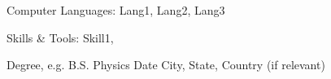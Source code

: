 \documentclass{article}
\begin{document}

\begin{skills}
    \item[Computer Languages:] Lang1\competent, Lang2\priorexp, 
        Lang3\basicknowledge
    \item[Skills \& Tools:] Skill1, 
\end{skills}



{Degree, e.g. B.S. Physics}
{Date}
{City, State, Country (if relevant)}
\end{document}
